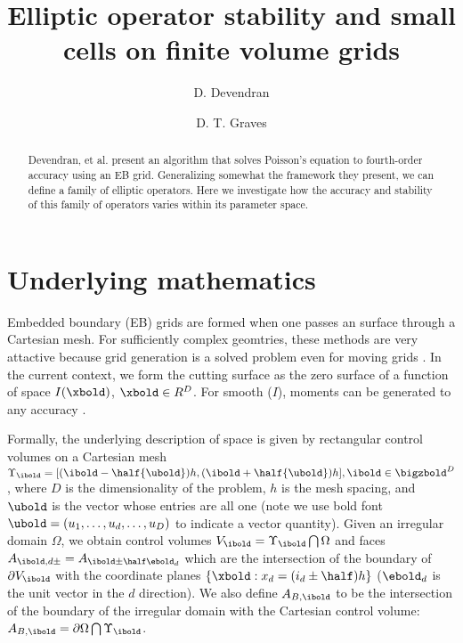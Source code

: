 \documentclass{article}
\begin{document}
\title{Elliptic operator stability and small cells on  finite volume grids}
\author{
   \and D. Devendran    \footnotemark[2]
   \and D. T. Graves    \footnotemark[1]
        }

\maketitle

\begin{abstract}

Devendran, et al. \cite{Devendran2017} present an algorithm that
solves Poisson's equation to fourth-order accuracy using an EB grid.
Generalizing somewhat  the framework they present, we can define a
family of elliptic operators.
Here we investigate how the accuracy and stability of this family
of operators varies within its parameter space.

\end{abstract}


\section{Underlying mathematics}

Embedded boundary (EB) grids are formed when one passes an  surface
through a Cartesian mesh.    For sufficiently complex geomtries, these methods
are very attactive because grid generation is a solved problem
even for moving grids \cite{MillerTrebotich2012}.
In the current context, we form the cutting surface as the zero
surface of a function  of space $I(\xbold)$, $\xbold \in R^D$.
For smooth ($I$),  moments can be generated to any
accuracy \cite{Schwartz2015}.

Formally, the underlying description of space
is given by rectangular control volumes on a Cartesian mesh
$\Upsilon_\ibold = [(\ibold-\half {\ubold})h, (\ibold+\half
{\ubold})h], \ibold \in \bigzbold^D$, where $D$ is the dimensionality
of the problem, $h$ is the mesh spacing, and ${\ubold}$ is the vector
whose entries are all one (note we use bold font $\ubold = (u_1, \dots, u_d,
\dots, u_D)$ to indicate a vector quantity).
Given an irregular domain $\Omega$, we
obtain control volumes $V_\ibold = \Upsilon_\ibold \bigcap \Omega$ and
faces $A_{\ibold,d\pm} = A_{\ibold \pm \half \ebold_d}$ which are the
intersection of the boundary of $\partial V_\ibold$ with the
coordinate planes $\{{\xbold}:x_d = (i_d \pm \half)h \}$ ($\ebold_d$ is
the unit vector in the $d$ direction).  We also
define $A_{B,\ibold}$ to be the intersection of the boundary of the
irregular domain with the Cartesian control volume: $A_{B,\ibold}
= \partial \Omega \bigcap \Upsilon_\ibold$. 
\end{document}
